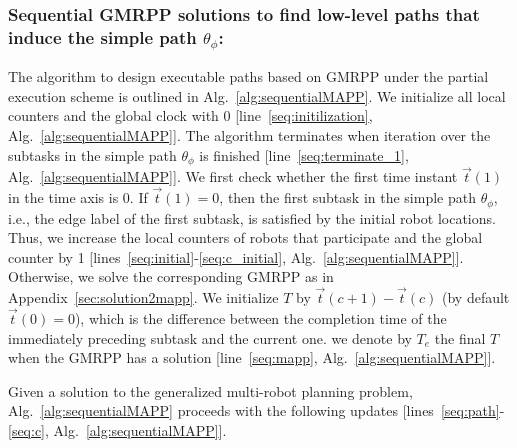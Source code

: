 \documentclass[Afour,sageh,times]{sagej}
\begin{document}
{{{\begin{algorithm}[!t]
{{        }
      }
\end{algorithm}}

 \subsubsection{Sequential GMRPP solutions to find low-level paths that induce the simple path $\theta_{\phi}$:}
 The algorithm to design executable paths based on GMRPP under the  partial execution scheme is outlined in Alg.~\ref{alg:sequentialMAPP}.  We initialize all local counters and the global clock with 0 [line~\ref{seq:initilization}, Alg.~\ref{alg:sequentialMAPP}]. The algorithm  terminates when iteration over  the subtasks in the simple path $\theta_{\phi}$ is finished [line~\ref{seq:terminate_1}, Alg.~\ref{alg:sequentialMAPP}].  We first check whether the first time instant $\vec{t}(1)$ in the time axis is 0. If $\vec{t}(1)=0$, then the first subtask in the simple path $\theta_{\phi}$, i.e., the edge label of the first subtask, is satisfied by the initial robot locations. Thus, we increase the local counters of robots that participate and the global counter by 1 [lines~\ref{seq:initial}-\ref{seq:c_initial}, Alg.~\ref{alg:sequentialMAPP}]. Otherwise, we solve the corresponding GMRPP as in Appendix~\ref{sec:solution2mapp}.  We initialize $T$ by $\vec{t}(c+1) - \vec{t}(c)$ (by default $\vec{t}(0)=0$),  which is the difference between the completion time of the immediately preceding subtask and the current one. %
we denote by $T_e$  the final $T$  when  the GMRPP has a solution [line~\ref{seq:mapp}, Alg.~\ref{alg:sequentialMAPP}]. {Given a solution to the generalized multi-robot planning problem, Alg.~\ref{alg:sequentialMAPP} proceeds with the following updates [lines~\ref{seq:path}-\ref{seq:c}, Alg.~\ref{alg:sequentialMAPP}].

}}}
\end{document}
